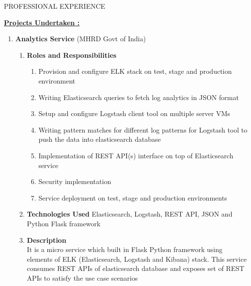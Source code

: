 \documentclass{resume} %
\newcommand{\blank}[1]{\hspace*{#1}}
\begin{document}
\begin{rSection}{PROFESSIONAL EXPERIENCE}
\begin{rSubsection}






\uline {\textbf{Projects Undertaken :}}
\sectionlineskip

\begin{enumerate}[label=\bfseries\arabic*]

\item \textbf{Analytics Service} (MHRD Govt of India)
  \begin{enumerate}
  \item \textbf{Roles and Responsibilities }
    \begin{enumerate}
    \item Provision and configure ELK stack on test, stage and
      production environment
    \item Writing Elasticsearch queries to fetch log analytics in JSON
      format
    \item Setup and configure Logstash client tool on multiple server
      VMs
    \item Writing pattern matches for different log patterns for
      Logstash tool to push the data into elasticsearch database
    \item Implementation of REST API(s) interface on top of
      Elasticsearch service
    \item Security implementation
    \item Service deployment on test, stage and production environments
    \end{enumerate}
  \item \textbf{Technologies Used } Elasticsearch, Logstash, REST API,
    JSON and Python Flask framework
  \item \textbf{Description } \\ \blank{2 cm} It is a micro
    service which built in Flask Python framework using
    elements of ELK (Elasticsearch, Logstash and Kibana)
    stack. This service consumes REST APIs of elasticsearch
    database and exposes set of REST APIs to satisfy the use
    case scenarios
  \end{enumerate}


\end{enumerate}
\end{rSubsection}
\end{rSection}
\end{document}
